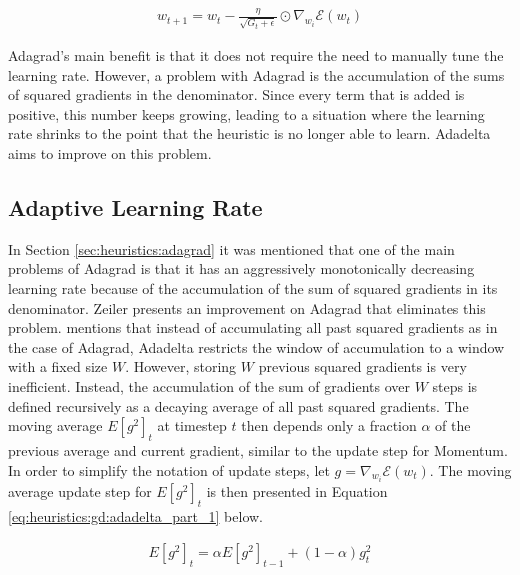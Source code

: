 \begin{equation}
      \label{eq:heuristics:gd:adagrad_part_2}
      \begin{split}
            w_{t+1} = w_{t} - \frac{\eta}{\sqrt{G_{t} + \epsilon}} \odot \nabla_{w_{i}}\mathcal{E}(w_{t})
      \end{split}
\end{equation}

\Ac{Adagrad}'s main benefit is that it does not require the need to manually tune the learning rate. However, a problem with \ac{Adagrad} is the accumulation of the sums of squared gradients in the denominator. Since every term that is added is positive, this number keeps growing, leading to a situation where the learning rate shrinks to the point that the heuristic is no longer able to learn. \acl{Adadelta} aims to improve on this problem.

\subsection{Adaptive Learning Rate}
\label{sec:heuristics:adadelta}

In Section \ref{sec:heuristics:adagrad} it was mentioned that one of the main problems of \ac{Adagrad} is that it has an aggressively monotonically decreasing learning rate because of the accumulation of the sum of squared gradients in its denominator. Zeiler \cite{ref:zeiler:2012} presents an improvement on \ac{Adagrad} that eliminates this problem. \citeauthor{ref:ruder:2016} \cite{ref:ruder:2016} mentions that instead of accumulating all past squared gradients as in the case of \ac{Adagrad}, \ac{Adadelta} restricts the window of accumulation to a window with a fixed size $W$. However, storing $W$ previous squared gradients is very inefficient. Instead, the accumulation of the sum of gradients over $W$ steps is defined recursively as a decaying average of all past squared gradients. The moving average $E[g^{2}]_{t}$ at timestep $t$ then depends only a fraction $\alpha$ of the previous average and current gradient, similar to the update step for \ac{Momentum}. In order to simplify the notation of update steps, let $g = \nabla_{w_{i}}\mathcal{E}(w_{t})$. The moving average update step for $E[g^{2}]_{t}$ is then presented in Equation \ref{eq:heuristics:gd:adadelta_part_1} below.

\begin{equation}
      \label{eq:heuristics:gd:adadelta_part_1}
      \begin{split}
            E[g^{2}]_{t} = \alpha E[g^{2}]_{t - 1} + (1 - \alpha)g_{t}^{2}
      \end{split}
\end{equation}


